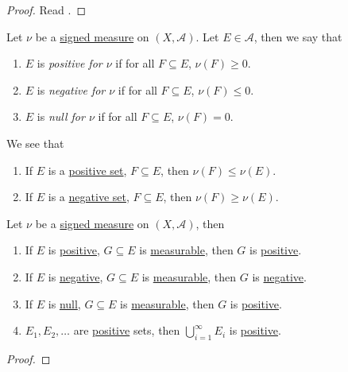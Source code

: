 \begin{proof}
  Read \cite{folland1999real}.
\end{proof}

\begin{definition}
  Let \(\nu\) be a \hyperref[def:signed-measure]{signed measure} on \((X, \mathcal{A})\). Let \(E \in \mathcal{A}\), then we say that
  \begin{enumerate}
    \item\label{def:positive-set-for-a-signed-measure} \(E\) is \emph{positive for \(\nu\)} if for all \(F \subseteq E\), \(\nu(F) \geq 0\).
    \item\label{def:negative-set-for-a-signed-measure} \(E\) is \emph{negative for \(\nu\)} if for all \(F \subseteq E\), \(\nu(F) \leq 0\).
    \item\label{def:null-set-for-a-signed-measure} \(E\) is \emph{null for \(\nu\)} if for all \(F \subseteq E\), \(\nu(F) = 0\).
  \end{enumerate}
\end{definition}

\begin{note}
  We see that
  \begin{enumerate}
    \item If \(E\) is a \hyperref[def:positive-set-for-a-signed-measure]{positive set}, \(F \subseteq E\), then \(\nu(F) \leq \nu(E)\).
    \item If \(E\) is a \hyperref[def:negative-set-for-a-signed-measure]{negative set}, \(F \subseteq E\), then \(\nu(F) \geq \nu(E)\).
  \end{enumerate}
\end{note}

\begin{lemma}\label{lma:lec28-1}
  Let \(\nu\) be a \hyperref[def:signed-measure]{signed measure} on \((X, \mathcal{A})\), then
  \begin{enumerate}
    \item If \(E\) is \hyperref[def:positive-set-for-a-signed-measure]{positive}, \(G \subseteq E\) is \hyperref[def:measurable-set]{measurable},
          then \(G\) is \hyperref[def:positive-set-for-a-signed-measure]{positive}.
    \item If \(E\) is \hyperref[def:negative-set-for-a-signed-measure]{negative}, \(G \subseteq E\) is \hyperref[def:measurable-set]{measurable},
          then \(G\) is \hyperref[def:negative-set-for-a-signed-measure]{negative}.
    \item If \(E\) is \hyperref[def:null-set-for-a-signed-measure]{null}, \(G \subseteq E\) is \hyperref[def:measurable-set]{measurable},
          then \(G\) is \hyperref[def:positive-set-for-a-signed-measure]{positive}.
    \item \(E_1,E_2,\ldots\) are \hyperref[def:positive-set-for-a-signed-measure]{positive} sets,
          then \(\bigcup_{i=1}^\infty E_i\) is \hyperref[def:positive-set-for-a-signed-measure]{positive}.
  \end{enumerate}
\end{lemma}
\begin{proof}
\end{proof}


